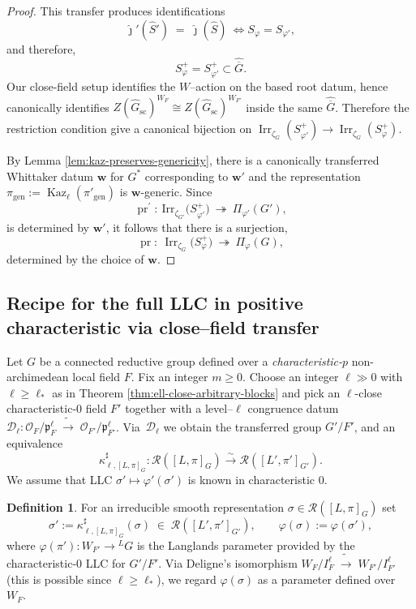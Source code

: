 \documentclass[american]{article}
\numberwithin{equation}{section}
\numberwithin{figure}{section}
\theoremstyle{plain}
\theoremstyle{definition}
\newtheorem{definition}[theorem]{Definition}
\theoremstyle{remark}
\DeclareMathOperator{\Irr}{Irr}
\DeclareMathOperator{\Kaz}{Kaz}
\newcommand{\OO}{\mathcal{O}}
\begin{document}
\begin{proof}
This transfer produces identifications 
\[
\hat\jmath'(\widehat S')\;=\;\hat\jmath(\widehat S)\  \Leftrightarrow S_{\varphi}=S_{\varphi'},
\]
and therefore, 
\[
S_{\varphi}^{+}=S_{\varphi'}^{+}\subset\widehat{\overline G}.
\]
Our close-field setup identifies the $W$--action on the based root datum, hence canonically identifies 
\(Z(\widehat G_{\mathrm{sc}})^{W_F}\cong Z(\widehat G_{\mathrm{sc}})^{W_{F'}}\) inside the same $\widehat{\overline G}$. Therefore the restriction condition give a canonical bijection on
\(\Irr_{\zeta_{G}}(S_{\varphi'}^{+})\to \Irr_{\zeta_{G}}(S_{\varphi}^{+})\).

By Lemma \ref{lem:kaz-preserves-genericity}, there is a canonically transferred Whittaker datum \(\mathbf{w}\) for \(G^*\) corresponding to \(\mathbf{w'}\) and the representation \(\pi_{\mathrm{gen}}:=\Kaz_{\ell}(\pi'_{\mathrm{gen}})\) is \(\mathbf{w}\)-generic. Since 
\[
\operatorname{pr}^\prime:\ \mathrm{Irr}_{\zeta_{G'}}\!\bigl(S_{\varphi'}^{+}\bigr)\ \twoheadrightarrow\ \Pi_{\varphi'}(G'),
\]
is determined by \(\mathbf{w'}\), it follows that there is a  surjection, 
\[
\operatorname{pr}:\ \Irr_{\zeta_G}\!\bigl(S_\varphi^{+}\bigr)\ \twoheadrightarrow\ \Pi_{\varphi}(G),
\]
determined by the choice of \(\mathbf{w}\). 
\end{proof}

\subsection{Recipe for the full LLC in positive characteristic via close--field transfer}
\label{sec:LLC_recipe_poschar}

Let \(G\) be a connected reductive group defined over a \emph{characteristic-\(p\)} non-archimedean
local field \(F\).
Fix an integer \(m\ge 0\).
Choose an integer \(\ell\gg 0\) with
\(\ell\ge \ell_{*}\) as in Theorem \ref{thm:ell-close-arbitrary-blocks} 
and pick an \(\ell\)-close characteristic-\(0\) field
\(F'\) together with a level--\(\ell\) congruence datum
\(\mathcal D_{\ell}\colon \OO_F/\mathfrak p_F^{\ell}\;\widetilde{\longrightarrow}\;\OO_{F'}/\mathfrak p_{F'}^{\ell}\).
Via~\(\mathcal D_{\ell}\) we obtain the transferred group \(G'/F'\), and  an equivalence
\[
\kappa_{\ell,[L,\pi]_G}^{\sharp}
:\mathcal R([L,\pi]_G)\xrightarrow{\sim}\mathcal R([L',\pi']_{G'}) .
\]
We assume that LLC $\sigma' \mapsto \varphi'(\sigma')$ is known in characteristic $0$. 

\begin{definition}\label{def:parameter_poschar}
For an irreducible smooth representation
\(\sigma\in\mathcal R([L,\pi]_G)\)
set
\[
  \sigma':=\kappa_{\ell,[L,\pi]_G}^{\sharp}(\sigma)\;\in\;\mathcal R([L',\pi']_{G'}),
  \qquad
  \varphi(\sigma):=\varphi(\sigma'),
\]
where \(\varphi(\pi')\colon W_{F'}\to{}^LG\) is the Langlands parameter
provided by the characteristic-\(0\) LLC for \(G'/F'\). 
Via Deligne's isomorphism
\(W_F/I_F^{\ell}\;\widetilde{\longrightarrow}\;W_{F'}/I_{F'}^{\ell}\)
(this is possible since \(\ell\ge\ell_*\)),
we regard \(\varphi(\sigma)\) as a parameter defined over \(W_F\).
\end{definition}
\end{document}
